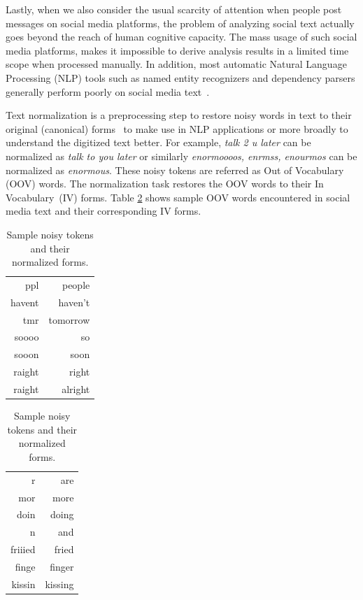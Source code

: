 \documentclass[preprint,review,12pt]{elsarticle}
\begin{document}
Lastly, when we also consider the usual scarcity of attention when people post messages on social media platforms, the problem of analyzing social text actually goes beyond the reach of human cognitive capacity. The mass usage of such social media platforms, makes it impossible to derive analysis results in a limited time scope when processed manually. In addition, most automatic Natural Language Processing (NLP) tools such as named entity recognizers and  dependency parsers generally perform poorly on social media text~\cite{ritter2010unsupervised}.

Text normalization is a preprocessing step to restore noisy words in text to their original (canonical) forms~\cite{Han:2011:LNS:2002472.2002520} to make use in NLP applications or more broadly to understand the digitized text better. For example, \textit{talk 2 u later} can be normalized as \textit{talk to you later} or similarly \textit{enormoooos, enrmss, enourmos} can be normalized as \textit{enormous}. These noisy tokens are referred as Out of Vocabulary (OOV) words. The normalization task restores the OOV words to their In Vocabulary~(IV) forms. Table \ref{tab:normalizations} shows sample OOV words encountered in social media text and their corresponding IV forms.

\begin{table}[tbhp]
\begin{minipage}[c]{.5\linewidth}
\centering
\begin{tabular}[h]{|r|r|}
\hline
ppl & people \\
havent & haven't \\
tmr &   tomorrow \\
soooo &  so \\
sooon &  soon \\
raight & right \\
raight & alright \\
\hline
\end{tabular}
\end{minipage}
\begin{minipage}[c]{.5\linewidth}
\centering
\begin{tabular}[h]{|r|r|}
\hline
r  &  are \\
mor &    more \\
doin &   doing \\
n &      and \\
friiied &  fried \\
finge &  finger \\
kissin & kissing \\
\hline
\end{tabular}
\end{minipage}
\caption{Sample noisy tokens and their normalized forms.}
\label{tab:normalizations}
\end{table}
\end{document}
